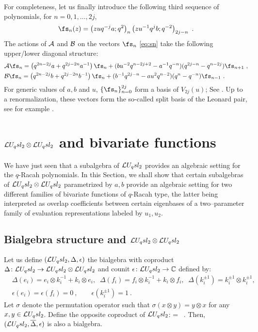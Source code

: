 \documentclass[11pt]{amsart}
\numberwithin{equation}{section}
\numberwithin{equation}{section}
\begin{document}
For completeness, let us finally introduce the following third sequence of polynomials, for $n=0,1,\dots, 2j$,
\begin{align}
    \fs_n(z)=\left(z u q^{-j}a;q^2\right)_{n}\left(zu^{-1}q^{j}b;q^{-2}\right)_{2j-n}\ .\label{eq:sn}
\end{align}
The actions of $\cal A$ and $\cal B$ on the vectors $\fs_n$ \eqref{eq:sn}  take the following upper/lower diagonal structure:
 \begin{align} 
    &    \mathcal{A} \fs_n=\left(q^{2n-2j}a+ q^{2j-2n}a^{-1} \right) \fs_n +(bu^{-2}q^{n-2j+2}-a^{-1}q^{-n})(q^{2j-n}-q^{n-2j})\fs_{n+1}\ ,\label{eq:actAsplit} \\
     &     \mathcal{B} \fs_n=\left(q^{2n-2j}b + q^{2j-2n}b^{-1} \right) \fs_n+(b^{-1}q^{2j-n}-au^{2}q^{n-2})(q^{n}-q^{-n})\fs_{n-1}\ .\label{eq:actBsplit}
    \end{align}
For generic values of $a,b$ and $u$,   $\{\fs_n\}_{n=0}^{2j}$ form a basis of $V_{2j}(u)$; See \cite[Lem.\,5.1 for $N=1$]{BVZ16}. 
Up to a renormalization, these vectors form the so-called split basis of the Leonard pair, see for example \cite{T05}.


\section{$\mathcal{L} U_q sl_2 \otimes \mathcal{L} U_q sl_2$ and bivariate functions}\label{sec:biloop}

We have just seen that a subalgebra of $\mathcal{L} U_q sl_2$ provides an algebraic setting for the $q$-Racah polynomials. In this Section, we shall show that certain subalgebras of $\mathcal{L} U_q sl_2 \otimes \mathcal{L} U_q sl_2$ parametrized by $a,b$ provide an algebraic setting for  
two different families of bivariate functions  of $q$-Racah type, the latter being interpreted as overlap coefficients between certain eigenbases of a two--parameter family of evaluation representations labeled by $u_1,u_2$. 

\subsection{Bialgebra structure and $\mathcal{L} U_q sl_2 \otimes\mathcal{L} U_q sl_2$}
Let us define $(\mathcal{L} U_q sl_2,\Delta,\epsilon)$ the bialgebra with coproduct $\Delta \colon \mathcal{L} U_q sl_2 \to \mathcal{L} U_q sl_2 \otimes\mathcal{L} U_q sl_2$ and counit $\epsilon \colon \mathcal{L} U_q sl_2\to  {\mathbb C} $ defined by:
		\begin{align} \label{affinecoprodefk}
			&\Delta(e_i)= e_i \otimes k_i^{-1}  + k_i \otimes e_i , \; \; \Delta(f_i) =f_i \otimes k_i^{-1} + k_i \otimes f_i, \; \; \Delta(k_i^{\pm 1}) = k_i^{ \pm 1} \otimes k_i^{\pm 1} , \\
            \label{affine-counit}
			&\epsilon(e_i)=\epsilon(f_i)=0\ , \qquad  \epsilon(k_i^{\pm 1})=1 \ .
		\end{align}
Let $\sigma$ denote the permutation operator such that $\sigma(x\otimes y) = y \otimes x$ for any $x,y\in \mathcal{L} U_q sl_2$.
Define the opposite coproduct of $\mathcal{L} U_q sl_2$:
		\beqa
		\overline{\Delta}  = \sigma \circ \Delta\ .
		\eeqa
Then, $(\mathcal{L} U_q sl_2,\overline\Delta,\epsilon)$ is also a bialgebra. 	
\end{document}
